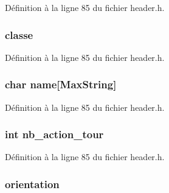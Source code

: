 Définition à la ligne 85 du fichier header.\+h.

\hypertarget{structt__character_a6d86411cdb6af508aed7d5904887ac6e}{
\subsubsection[{classe}]{ classe}}\label{structt__character_a6d86411cdb6af508aed7d5904887ac6e}


Définition à la ligne 85 du fichier header.\+h.

\hypertarget{structt__character_ab27f28c5ead39031421706ddbbd1edea}{
\subsubsection[{name}]{\setlength{\rightskip}{0pt plus 5cm}char name\mbox{[}{\bf Max\+String}\mbox{]}}}\label{structt__character_ab27f28c5ead39031421706ddbbd1edea}


Définition à la ligne 85 du fichier header.\+h.

\hypertarget{structt__character_aaff424b51f4bd3db2c199cc08f21f86d}{
\subsubsection[{nb\+\_\+action\+\_\+tour}]{\setlength{\rightskip}{0pt plus 5cm}int nb\+\_\+action\+\_\+tour}}\label{structt__character_aaff424b51f4bd3db2c199cc08f21f86d}


Définition à la ligne 85 du fichier header.\+h.

\hypertarget{structt__character_af778044107ad1a59b9725fa3962560ad}{
\subsubsection[{orientation}]{ orientation}}\label{structt__character_af778044107ad1a59b9725fa3962560ad}


